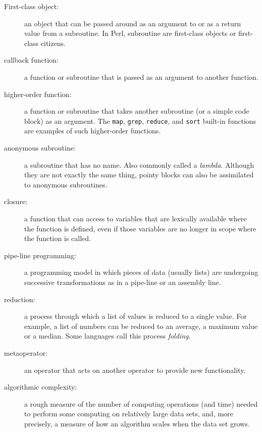 \begin{description}

\item[First-class object:] an object that can be passed around 
as an argument to or as a return value from a subroutine. In 
Perl, subroutine are first-class objects or first-class citizens. 

\item[callback function:] a function or subroutine that is 
passed as an argument to another function.

\item[higher-order function:] a function or subroutine that takes 
another subroutine (or a simple code block) as an argument. The 
{\tt map}, {\tt grep}, {\tt reduce}, and {\tt sort} built-in 
functions are examples of such higher-order functions.

\item[anonymous subroutine:] a subroutine that has no name. Also 
commonly called a \emph{lambda}. Although they are not exactly 
the same thing, pointy blocks can also be assimilated to 
anonymous subroutines.

\item[closure:] a function that can access to variables that 
are lexically available where the function is defined, even 
if those variables are no longer in scope where the function 
is called.

\item[pipe-line programming:] a programming model in which 
pieces of data (usually lists) are undergoing successive 
transformations as in a pipe-line or an assembly line.

\item[reduction:] a process through which a list of values is 
reduced to a single value. For example, a list of numbers 
can be reduced to an average, a maximum value or a median. 
Some languages call this process \emph{folding}.

\item[metaoperator:] an operator that acts on another operator 
to provide new functionality.

\item[algorithmic complexity:] a rough measure of the number 
of computing operations (and time) needed to perform some 
computing on relatively large data sets, and, more precisely, 
a measure of how an algorithm scales when the data set grows.


\end{description}
